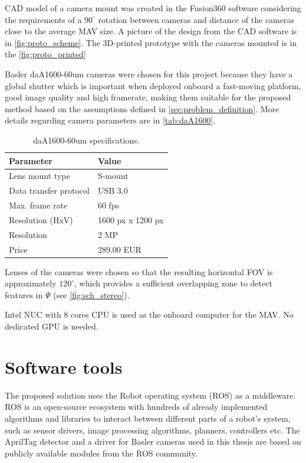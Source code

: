 CAD model of a camera mount was created in the Fusion360 software considering the requirements of a $90^\circ$ rotation between cameras and distance of the cameras close to the average MAV size.
A picture of the design from the CAD software is in \autoref{fig:proto_scheme}.
The 3D-printed prototype with the cameras mounted is in the \autoref{fig:proto_printed}

Basler daA1600-60um cameras were chosen for this project because they have a global shutter which is important when deployed onboard a fast-moving platform, good image quality and high framerate, making them suitable for the proposed method based on the assumptions defined in \autoref{sec:problem_definition}. 
More details regurding camera parameters are in \autoref{tab:daA1600}.

\begin{table}
    \caption{daA1600-60um specifications.}
    \label{tab:daA1600}
    \begin{center}
      \begin{tabular}{ l l }
      \hline
      Parameter              & Value          \\ \hline
      Lens mount type        & S-mount           \\
      Data transfer protocol & USB 3.0           \\
      Max. frame rate        & 60 fps            \\
      Resolution (HxV)       & 1600 px x 1200 px \\
      Resolution             & 2 MP              \\
      Price                  & 289.00 EUR        \\ \hline
      \end{tabular}
    \end{center}
\end{table}

Lenses of the cameras were chosen so that the resulting horizontal FOV is approximately $120^\circ$, which provides a sufficient overlapping zone to detect features in $\Psi$ (see \autoref{fig:sch_stereo}).

Intel NUC with 8 cores CPU is used as the onboard computer for the MAV. 
No dedicated GPU is needed.

\section{Software tools}
\label{sec:impl_software}

The proposed solution uses the Robot operating system (ROS) \cite{Rospaper} as a middleware.
ROS is an open-source ecosystem with hundreds of already implemented algorithms and libraries to interact between different parts of a robot's system, such as sensor drivers, image processing algorithms, planners, controllers etc.
The AprilTag detector and a driver for Basler cameras used in this thesis are based on publicly available modules from the ROS community.

